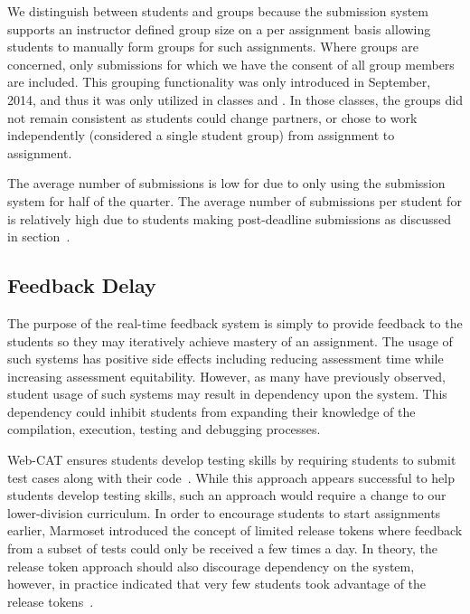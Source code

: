 We distinguish between students and groups because the submission system
supports an instructor defined group size on a per assignment basis allowing
students to manually form groups for such assignments. Where groups are
concerned, only submissions for which we have the consent of all group members
are included. This grouping functionality was only introduced in September,
2014, and thus it was only utilized in classes  and . In
those classes, the groups did not remain consistent as students could change
partners, or chose to work independently (considered a single student group)
from assignment to assignment.

The average number of submissions is low for  due to only using the
submission system for half of the quarter. The average number of submissions
per student for  is relatively high due to students making
post-deadline submissions as discussed in section~.


\subsection{Feedback Delay}
The purpose of the real-time feedback system is simply to provide feedback to
the students so they may iteratively achieve mastery of an assignment. The
usage of such systems has positive side effects including reducing assessment
time while increasing assessment equitability. However, as many have previously
observed, student usage of such systems may result in dependency upon the
system. This dependency could inhibit students from expanding their knowledge
of the compilation, execution, testing and debugging processes.

Web-CAT ensures students develop testing skills by requiring students to submit
test cases along with their code~\cite{Edwards:2003:RCS:949344.949390}. While
this approach appears successful to help students develop testing skills, such
an approach would require a change to our lower-division curriculum. In order
to encourage students to start assignments earlier, Marmoset introduced the
concept of limited release tokens where feedback from a subset of tests could
only be received a few times a day. In theory, the release token approach
should also discourage dependency on the system, however, in practice \spacco{}
indicated that very few students took advantage of the release
tokens~\cite{Spacco:2013:TIP:2462476.2465594}.

